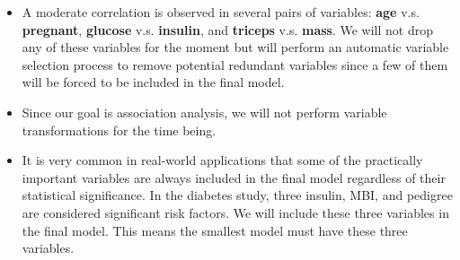 \documentclass[
]{book}
\newenvironment{Shaded}{\begin{snugshade}}{\end{snugshade}}
\newcommand{\DecValTok}[1]{\textcolor[rgb]{0.00,0.00,0.81}{#1}}
\newcommand{\DocumentationTok}[1]{\textcolor[rgb]{0.56,0.35,0.01}{\textbf{\textit{#1}}}}
\newcommand{\FunctionTok}[1]{\textcolor[rgb]{0.13,0.29,0.53}{\textbf{#1}}}
\newcommand{\NormalTok}[1]{#1}
\newcommand{\OtherTok}[1]{\textcolor[rgb]{0.56,0.35,0.01}{#1}}
\newcommand{\SpecialCharTok}[1]{\textcolor[rgb]{0.81,0.36,0.00}{\textbf{#1}}}
\newcommand{\StringTok}[1]{\textcolor[rgb]{0.31,0.60,0.02}{#1}}
\begin{document}
\begin{Shaded}
\end{Shaded}

\begin{itemize}
\item
  A moderate correlation is observed in several pairs of variables: \textbf{age} v.s. \textbf{pregnant}, \textbf{glucose} v.s. \textbf{insulin}, and \textbf{triceps} v.s. \textbf{mass}. We will not drop any of these variables for the moment but will perform an automatic variable selection process to remove potential redundant variables since a few of them will be forced to be included in the final model.
\item
  Since our goal is association analysis, we will not perform variable transformations for the time being.
\item
  It is very common in real-world applications that some of the practically important variables are always included in the final model regardless of their statistical significance. In the diabetes study, three insulin, MBI, and pedigree are considered significant risk factors. We will include these three variables in the final model. This means the smallest model must have these three variables.
\end{itemize}
\end{document}
